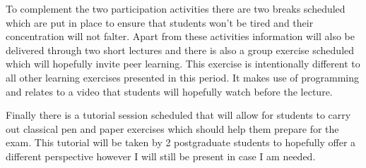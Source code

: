 \documentclass[12pt]{article}
\begin{document}
To complement the two participation activities there are two breaks scheduled which are put in place to ensure that students won't be tired and their concentration will not falter. Apart from these activities information will also be delivered through two short lectures and there is also a group exercise scheduled which will hopefully invite peer learning. This exercise is intentionally different to all other learning exercises presented in this period. It makes use of programming and relates to a video that students will hopefully watch before the lecture.

Finally there is a tutorial session scheduled that will allow for students to carry out classical pen and paper exercises which should help them prepare for the exam. This tutorial will be taken by 2 postgraduate students to hopefully offer a different perspective however I will still be present in case I am needed.
\end{document}
